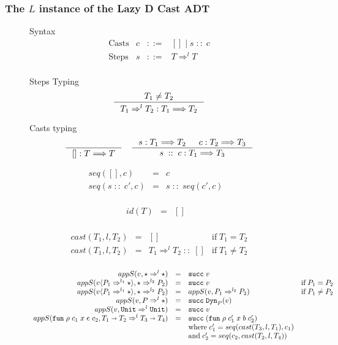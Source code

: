 \documentclass[acmsmall,review,anonymous]{acmart}\settopmatter{printfolios=true,printccs=false,printacmref=false}
\newcommand{\stxrule}[3]{\text{#2} & #1 & ::= & #3\\}
\newcommand{\funrule}[3]{#1 &=& #2 & #3\\}
\newcommand{\judgeTypeFT}[3]{#1 : #2 \Longrightarrow #3} %
\newcommand{\POOunit}[0]{\mathtt{Unit}}
\newcommand{\POOfun}[2]{#1 \shortrightarrow #2}
\newcommand{\cOOcast}[3]{#1 \Rightarrow^{#2} #3}
\newcommand{\vOOcast}[2]{#1\langle#2\rangle}
\newcommand{\rOOsucc}[1]{\mathtt{succ}\;#1}
\newcommand{\hcvOOinj}[2]{\mathtt{Dyn}_{#1}(#2)}
\newcommand{\hcvOOfun}[5]{\mathtt{fun} \; #2 \; #1 \; #3 \; #4 \; #5}
\newcommand{\sidecond}[1]{\text{if}\;#1}
\newcommand{\lsOOcast}[3]{\cOOcast{#1}{#2}{#3}}
\newcommand{\lcOOnull}[0]{[]}
\newcommand{\lcOOcons}[2]{#1 \; :: \; #2}
\begin{document}
\subsubsection{The $L$ instance of the Lazy D Cast ADT}

\begin{figure}
Syntax
\[
\begin{array}{lrcl}
\stxrule{c}{Casts}{\lcOOnull{} \mid \lcOOcons{s}{c}}
\stxrule{s}{Steps}{\lsOOcast{T}{l}{T}}
\end{array}
\]

Steps Typing
\fbox{$\judgeTypeFT{s}{T}{T}$}
\begin{gather*}
\inference{
  T_1 \neq T_2
}{
  \judgeTypeFT{\lsOOcast{T_1}{l}{T_2}}{T_1}{T_2}
}
\end{gather*}

Casts typing
\fbox{$\judgeTypeFT{c}{T}{T}$}
\begin{gather*}
\inference{
}{
  \judgeTypeFT{\lcOOnull}{T}{T}
}
\quad
\inference{
  \judgeTypeFT{s}{T_1}{T_2} &
  \judgeTypeFT{c}{T_2}{T_3}
}{
  \judgeTypeFT{\lcOOcons{s}{c}}{T_1}{T_3}
}
\end{gather*}

\[
\begin{array}{rclr}
\funrule{seq(\lcOOnull,c)}{c}{}
\funrule{seq(\lcOOcons{s}{c'},c)}{\lcOOcons{s}{seq(c',c)}}{}
\end{array}
\]

\[
\begin{array}{rclr}
\funrule{id(T)}{\lcOOnull}{}
\end{array}
\]

\[
\begin{array}{rclc}
\funrule{cast(T_1,l,T_2)}{
  \lcOOnull
}{
  \sidecond{T_1 = T_2}
}
\funrule{cast(T_1,l,T_2)}{
  \lcOOcons{\lsOOcast{T_1}{l}{T_2}}{\lcOOnull}
}{
  \sidecond{T_1 \neq T_2}
}
\end{array}
\]

  
\[
\begin{array}{rclr}
\funrule{
  appS(v,\cOOcast{\star}{l}{\star})
}{
  \rOOsucc{v}
}{}
\funrule{
  appS(\vOOcast{v}{\cOOcast{P_1}{l_1}{\star}},\cOOcast{\star}{l_2}{P_2})
}{
  \rOOsucc{v}
}{\sidecond{P_1 = P_2}}
\funrule{
appS(\vOOcast{v}{\cOOcast{P_1}{l_1}{\star}},\cOOcast{\star}{l_2}{P_2})
}{
appS(v,\cOOcast{P_1}{l_2}{P_2})
}{\sidecond{P_1 \neq P_2}}
\funrule{
  appS(v,\cOOcast{P}{l}{\star})
}{
  \rOOsucc{\hcvOOinj{P}{v}}
}{}
\funrule{
  appS(v,\lsOOcast{\POOunit}{l}{\POOunit})
}{
  \rOOsucc{v}
}{}
\funrule{
  appS(
    \hcvOOfun{c_1}{\rho}{x}{e}{c_2},
    \lsOOcast{\POOfun{T_1}{T_2}}{l}{\POOfun{T_3}{T_4}})
}{
  \rOOsucc{(\hcvOOfun{c_1'}{\rho}{x}{b}{c_2'})}
}{
  \\ &&
  \text{where} \;
  c_1' = seq(cast(T_3,l,T_1),c_1)
  \\ &&
  \text{and} \;
  c_2' = seq(c_2,cast(T_2,l,T_4))
}


\end{array}\]
\end{figure}
\end{document}
